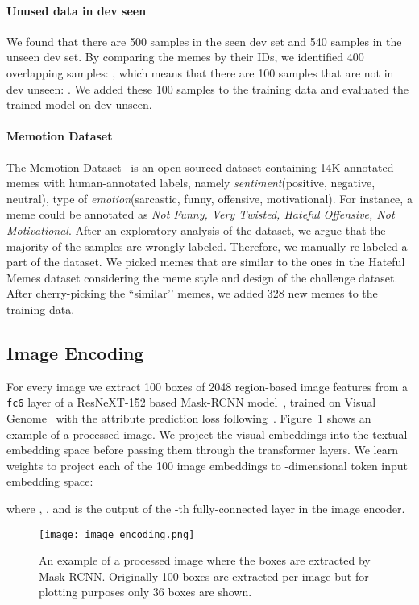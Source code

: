 \documentclass{article}
\begin{document}
  \paragraph{Unused data in dev seen}
  We found that there are 500 samples in the seen dev set and 540 samples in the unseen dev set. By comparing the memes by their IDs, we identified 400 overlapping samples: , which means that there are 100 samples that are not in dev unseen: . We added these 100 samples to the training data and evaluated the trained model on dev unseen. 

  \paragraph{Memotion Dataset}
The Memotion Dataset~\cite{sharma2020semeval} is an open-sourced dataset containing 14K annotated memes with human-annotated labels, namely \emph{sentiment}(positive, negative, neutral), type of \emph{emotion}(sarcastic, funny, offensive, motivational). For instance, a meme could be annotated as \emph{Not Funny, Very Twisted, Hateful Offensive, Not Motivational}. After an exploratory analysis of the dataset, we argue that the majority of the samples are wrongly labeled. Therefore, we manually re-labeled a part of the dataset. We picked memes that are similar to the ones in the Hateful Memes dataset considering the meme style and design of the challenge dataset. After cherry-picking the ``similar’’ memes, we added 328 new memes to the training data.

\subsection{Image Encoding}
  For every image we extract 100 boxes of 2048 region-based image features from a \texttt{fc6} layer of a ResNeXT-152 based Mask-RCNN model~\cite{he2017mask}, trained on Visual Genome~\cite{krishna2017visual} with the attribute prediction loss following~\cite{anderson2018bottom}. Figure~\ref{fig:processed} shows an example of a processed image. We project the visual embeddings into the textual embedding space before passing them through the transformer layers. We learn weights  to project each of the 100 image embeddings to -dimensional token input embedding space:
    
  where , , and  is the output of the -th fully-connected layer in the image encoder.

\begin{figure} 
  \centering
  \texttt{[image: image\_encoding.png]}
  \caption{An example of a processed image where the boxes are extracted by Mask-RCNN. Originally 100 boxes are extracted per image but for plotting purposes only 36 boxes are shown.}
  \label{fig:processed}
\end{figure}
\end{document}
